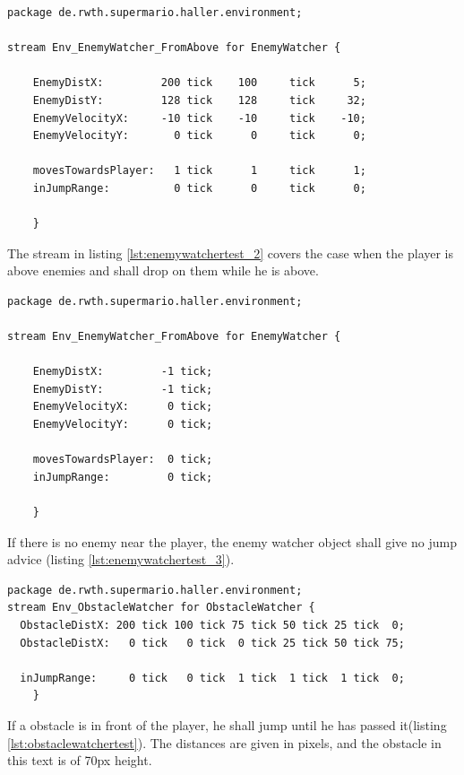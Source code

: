 \begin{lstlisting}[label=lst:enemywatchertest_2, caption=Enemy watcher stream test, morekeywords={package, stream, tick, for},
frame=single, basicstyle=\small, float,floatplacement=H]
package de.rwth.supermario.haller.environment;

stream Env_EnemyWatcher_FromAbove for EnemyWatcher {
        
    EnemyDistX:         200 tick    100     tick      5;
    EnemyDistY:         128 tick    128     tick     32;
    EnemyVelocityX:     -10 tick    -10     tick    -10;
    EnemyVelocityY:       0 tick      0     tick      0;
            
    movesTowardsPlayer:   1 tick      1     tick      1;
    inJumpRange:          0 tick      0     tick      0;

    }
\end{lstlisting}
The stream in listing \ref{lst:enemywatchertest_2} covers the case when the player is above enemies and shall drop on them while he is above.



\begin{lstlisting}[label=lst:enemywatchertest_3, caption=Enemy watcher stream test, morekeywords={package, stream, tick, for},
frame=single, basicstyle=\small, float,floatplacement=H]
package de.rwth.supermario.haller.environment;

stream Env_EnemyWatcher_FromAbove for EnemyWatcher {
        
    EnemyDistX:         -1 tick;
    EnemyDistY:         -1 tick;
    EnemyVelocityX:      0 tick;
    EnemyVelocityY:      0 tick;
            
    movesTowardsPlayer:  0 tick;
    inJumpRange:         0 tick;

    }
\end{lstlisting}
If there is no enemy near the player, the enemy watcher object shall give no jump advice (listing \ref{lst:enemywatchertest_3}).



\begin{lstlisting}[label=lst:obstaclewatchertest, caption=Obstacle watcher stream test, morekeywords={package, stream, tick, for},
frame=single, basicstyle=\small, float,floatplacement=H]
package de.rwth.supermario.haller.environment;
stream Env_ObstacleWatcher for ObstacleWatcher {
  ObstacleDistX: 200 tick 100 tick 75 tick 50 tick 25 tick  0;
  ObstacleDistX:   0 tick   0 tick  0 tick 25 tick 50 tick 75;
    
  inJumpRange:     0 tick   0 tick  1 tick  1 tick  1 tick  0;
    }
\end{lstlisting}
If a obstacle is in front of the player, he shall jump until he has passed it(listing \ref{lst:obstaclewatchertest}). The distances are given in pixels, and the obstacle in this text is of 70px height.

